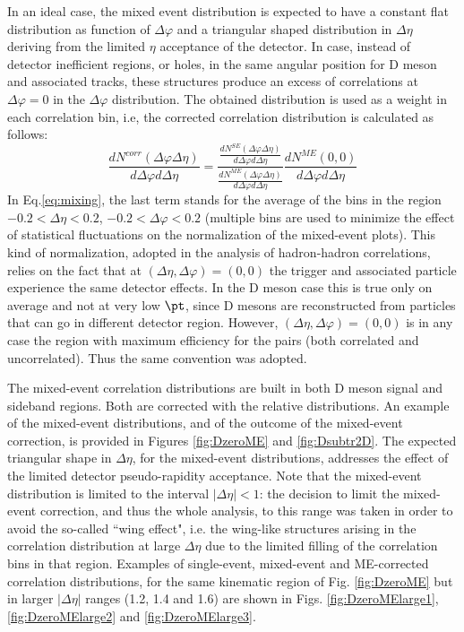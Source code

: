 In an ideal case, the mixed event distribution is expected to have a constant flat distribution as function of $\Delta\varphi$ and a triangular shaped distribution in $\Delta\eta$
deriving from the limited $\eta$ acceptance of the detector. In case, instead of detector inefficient regions, or holes, in the same angular position for D meson and associated tracks, these structures produce an excess of correlations at $\Delta\varphi=0$ in the $\Delta\varphi$ distribution. The obtained distribution is used as a weight in each correlation bin, i.e, the corrected correlation distribution is calculated as follows:
\begin{equation}
\label{eq:mixing}
\frac{dN^{corr}\left(\Delta\varphi \Delta\eta\right)}{d\Delta\varphi d\Delta\eta} = \frac{\frac{dN^{SE}\left(\Delta\varphi \Delta\eta\right)}{d\Delta\varphi d\Delta\eta} }{\frac{dN^{ME}\left(\Delta\varphi \Delta\eta\right)}{d\Delta\varphi d\Delta\eta} }\frac{dN^{ME}\left(0,  0\right)}{d\Delta\varphi d\Delta\eta}
\end{equation}
In Eq.\ref{eq:mixing}, the last term stands for the average of the bins in the region $-0.2 < \Delta\eta < 0.2$, $-0.2 < \Delta\varphi < 0.2$ (multiple bins are used to minimize the effect of statistical fluctuations on the normalization of the mixed-event plots).
This kind of normalization, adopted in the analysis of hadron-hadron correlations, relies on the fact that at $(\Delta\eta,\Delta\varphi)=(0,0)$ the trigger and associated particle experience the same detector effects. In the D meson case this is true only on average and not at very low $\pt$, since D mesons are reconstructed from particles that can go
in different detector region. However, $(\Delta\eta,\Delta\varphi)=(0,0)$ is in any case
the region with maximum efficiency for the pairs (both correlated and uncorrelated). Thus the same convention was adopted.

The mixed-event correlation distributions are built in both D meson signal and sideband regions. Both are
corrected with the relative distributions. An example of the mixed-event distributions, and of the outcome of the mixed-event correction, is provided in Figures \ref{fig:DzeroME} and \ref{fig:Dsubtr2D}. The expected triangular shape in $\Delta\eta$, for the mixed-event distributions, addresses the effect of the limited detector pseudo-rapidity acceptance. Note that the mixed-event distribution is limited to the interval $\left|\Delta\eta\right|<1$: the decision to limit the mixed-event correction, and thus the whole analysis, to this range was taken in order to avoid the so-called ``wing effect", i.e. the wing-like structures arising in the correlation distribution at large $\Delta\eta$ due to the limited filling of the correlation bins in that region. Examples of single-event, mixed-event and ME-corrected correlation distributions, for the same kinematic region of Fig. \ref{fig:DzeroME} but in larger $\left|\Delta\eta\right|$ ranges (1.2, 1.4 and 1.6) are shown in Figs. \ref{fig:DzeroMElarge1}, \ref{fig:DzeroMElarge2} and \ref{fig:DzeroMElarge3}.

